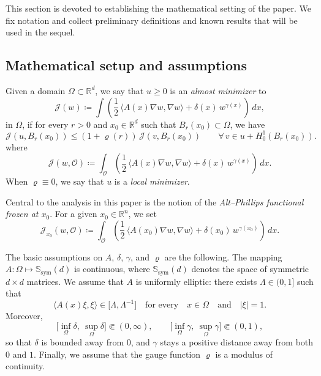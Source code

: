 \documentclass[reqno,11pt]{amsart}
\newcommand{\1}{\mathds{1}}  %
\numberwithin{equation}{section}
\begin{document}
This section is devoted to establishing the mathematical setting of the paper. We fix notation and collect preliminary definitions and known results that will be used in the sequel.

\subsection{Mathematical setup and assumptions}

Given a domain $\Omega \subset \mathbb{R}^d$, we say that $u \geq 0$ is an \emph{almost minimizer} to
\begin{equation}\label{def:main functional}
    \mathcal{J}(w) \coloneqq \int \left( \frac{1}{2} \, \langle A(x)\nabla w, \nabla w \rangle + \delta(x)\,w^{\gamma(x)} \right)\,dx,
\end{equation}
in $\Omega$, if for every $r>0$ and $x_0 \in \mathbb{R}^d$ such that $B_r(x_0) \subset \Omega$, we have
\[
    \mathcal{J}(u,B_r(x_0)) \le (1+\varrho(r))\,\mathcal{J}(v,B_r(x_0))
\qquad \forall\, v \in u + H^1_0(B_r(x_0)).
\]
where
\[
    \mathcal{J}(w,\mathcal{O}) \coloneqq \int_{\mathcal{O}} \left( \frac{1}{2} \, \langle A(x)\nabla w, \nabla w \rangle + \delta(x)\,w^{\gamma(x)} \right)\,dx.
\]
When $\varrho \equiv 0$, we say that $u$ is a \emph{local minimizer}.

Central to the analysis in this paper is the notion of the \emph{Alt--Phillips functional frozen at $x_0$}. For a given $x_0 \in \mathbb{R}^n$, we set
\[
	\mathcal{J}_{x_0}(w,\mathcal{O}) \coloneqq \int_\mathcal{O} \left( \frac{1}{2}\, \langle A(x_0)\nabla w, \nabla w \rangle + \delta(x_0)\,w^{\gamma(x_0)} \right)\,dx.
\]

\medskip

The basic assumptions on $A$, $\delta$, $\gamma$, and $\varrho$ are the following. The mapping
$A\colon \Omega \mapsto \mathbb{S}_{\mathrm{sym}}(d)$ is continuous, where $\mathbb{S}_{\mathrm{sym}}(d)$ denotes the space of symmetric $d \times d$ matrices. We assume that $A$ is uniformly elliptic: there exists $\Lambda \in (0,1]$ such that
\begin{equation*}
     \langle A(x)\xi, \xi \rangle \in \big[\Lambda,\Lambda^{-1}\big] \quad \text{for every} \quad x \in \Omega \quad \text{and} \quad |\xi| = 1.
\end{equation*}
Moreover,
\[
    \big[\inf_{\Omega}\delta,\ \sup_{\Omega}\delta\big]\Subset(0,\infty),
    \qquad
    \big[\inf_{\Omega}\gamma,\ \sup_{\Omega}\gamma\big]\Subset(0,1),
\]
so that $\delta$ is bounded away from $0$, and $\gamma$ stays a positive distance away from both $0$ and $1$. Finally, we assume that the gauge function $\varrho$ is a modulus of continuity.
 
\end{document}
